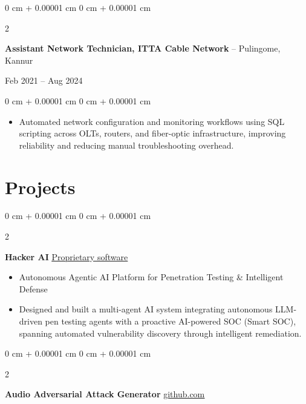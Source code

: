\documentclass[10pt, a4paper]{article}
\newenvironment{highlights}{
    \begin{itemize}[
        topsep=0.10 cm,
        parsep=0.10 cm,
        partopsep=0pt,
        itemsep=0pt,
        leftmargin=0 cm + 10pt
    ]
}{
    \end{itemize}
} %
\newenvironment{onecolentry}{
    \begin{adjustwidth}{
        0 cm + 0.00001 cm
    }{
        0 cm + 0.00001 cm
    }
}{
    \end{adjustwidth}
} %
\newenvironment{twocolentry}[2][]{
    \onecolentry
    \def\secondColumn{#2}
    \setcolumnwidth{\fill, 4.5 cm}
    \begin{paracol}{2}
}{
    \switchcolumn \raggedleft \secondColumn
    \end{paracol}
    \endonecolentry
} %
\begin{document}
        \vspace{0.2 cm}
    
    \begin{twocolentry}{
        Feb 2021 – Aug 2024
    }
        \textbf{Assistant Network Technician, ITTA Cable Network} -- Pulingome, Kannur
    \end{twocolentry}
    
    \vspace{0.10 cm}
    \begin{onecolentry}
        \begin{highlights}
            \item Automated network configuration and monitoring workflows using SQL scripting across OLTs, routers, and fiber-optic infrastructure, improving reliability and reducing manual troubleshooting overhead.
        \end{highlights}
    \end{onecolentry}

    \section{Projects}

            \begin{twocolentry}{
            \href{https://github.com/TimsTittus/Hacker-AI}{\underline{Proprietary software}}
        }
            \textbf{Hacker AI}\end{twocolentry}

        \vspace{0.01 cm}

            \begin{highlights}
                \item Autonomous Agentic AI Platform for Penetration Testing \& Intelligent Defense
                \item Designed and built a multi-agent AI system integrating autonomous LLM-driven pen testing agents with a proactive AI-powered SOC (Smart SOC), spanning automated vulnerability discovery through intelligent remediation.
            \end{highlights}

        \vspace{0.01 cm}

        \begin{twocolentry}{
            \href{https://github.com/TimsTittus/Audio-Adversarial-Attack-Generator}{\underline{github.com}}
        }
            \textbf{Audio Adversarial Attack Generator}\end{twocolentry}
\end{document}
